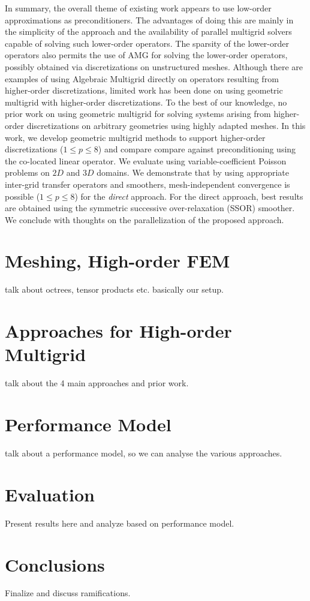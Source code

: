 \documentclass[times]{nlaauth}
\begin{document}
In summary, the overall theme of existing work appears to use
low-order approximations as preconditioners.  The advantages of doing
this are mainly in the simplicity of the approach and the availability
of parallel multigrid solvers capable of solving such lower-order
operators. The sparsity of the lower-order operators also permits the
use of AMG for solving the lower-order operators, possibly obtained
via discretizations on unstructured meshes.  Although there are
examples of using Algebraic Multigrid directly on operators resulting
from higher-order discretizations, limited work has been done on using
geometric multigrid with higher-order discretizations. To the best of
our knowledge, no prior work on using geometric multigrid for solving
systems arising from higher-order discretizations on arbitrary
geometries using highly adapted meshes.  In this work, we develop
geometric multigrid methods to support higher-order discretizations
($1\le p\le 8$) and compare compare against preconditioning using the
co-located linear operator. We evaluate using variable-coefficient
Poisson problems on $2D$ and $3D$ domains. We demonstrate that by
using appropriate inter-grid transfer operators and smoothers,
mesh-independent convergence is possible ($1\le p\le8$) for the {\em
direct} approach. For the direct approach, best results are obtained
using the symmetric successive over-relaxation (SSOR) smoother. We
conclude with thoughts on the parallelization of the proposed
approach.

\section{Meshing, High-order FEM}

talk about octrees, tensor products etc. basically our setup.

\section{Approaches for High-order Multigrid}

talk about the 4 main approaches and prior work.

\section{Performance Model}

talk about a performance model, so we can analyse the various approaches.

\section{Evaluation}

Present results here and analyze based on performance model.

\section{Conclusions}

Finalize and discuss ramifications.




\end{document}
